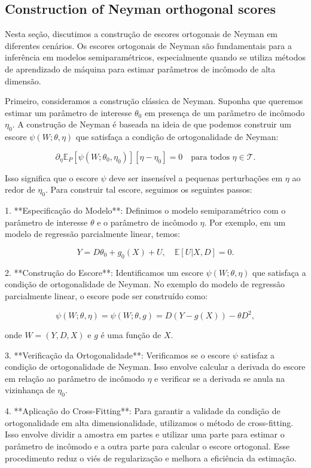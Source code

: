 \documentclass[a4paper,12pt]{article}[abntex2]
\begin{document}
\subsection{Construction  of  Neyman  orthogonal  scores}

Nesta seção, discutimos a construção de escores ortogonais de Neyman em diferentes cenários. Os escores ortogonais de Neyman são fundamentais para a inferência em modelos semiparamétricos, especialmente quando se utiliza métodos de aprendizado de máquina para estimar parâmetros de incômodo de alta dimensão.

Primeiro, consideramos a construção clássica de Neyman. Suponha que queremos estimar um parâmetro de interesse $\theta_0$ em presença de um parâmetro de incômodo $\eta_0$. A construção de Neyman é baseada na ideia de que podemos construir um escore $\psi(W; \theta, \eta)$ que satisfaça a condição de ortogonalidade de Neyman:

\[
\partial_\eta \mathbb{E}_P[\psi(W; \theta_0, \eta_0)][\eta - \eta_0] = 0 \quad \text{para todos } \eta \in \mathcal{T}.
\]

Isso significa que o escore $\psi$ deve ser insensível a pequenas perturbações em $\eta$ ao redor de $\eta_0$. Para construir tal escore, seguimos os seguintes passos:

1. **Especificação do Modelo**: Definimos o modelo semiparamétrico com o parâmetro de interesse $\theta$ e o parâmetro de incômodo $\eta$. Por exemplo, em um modelo de regressão parcialmente linear, temos:

\[
Y = D\theta_0 + g_0(X) + U, \quad \mathbb{E}[U | X,D] = 0.
\]

2. **Construção do Escore**: Identificamos um escore $\psi(W; \theta, \eta)$ que satisfaça a condição de ortogonalidade de Neyman. No exemplo do modelo de regressão parcialmente linear, o escore pode ser construído como:

\[
\psi(W; \theta, \eta) = \psi(W; \theta, g) = D(Y - g(X)) - \theta D^2,
\]

onde $W = (Y, D, X)$ e $g$ é uma função de $X$.

3. **Verificação da Ortogonalidade**: Verificamos se o escore $\psi$ satisfaz a condição de ortogonalidade de Neyman. Isso envolve calcular a derivada do escore em relação ao parâmetro de incômodo $\eta$ e verificar se a derivada se anula na vizinhança de $\eta_0$.

4. **Aplicação do Cross-Fitting**: Para garantir a validade da condição de ortogonalidade em alta dimensionalidade, utilizamos o método de cross-fitting. Isso envolve dividir a amostra em partes e utilizar uma parte para estimar o parâmetro de incômodo e a outra parte para calcular o escore ortogonal. Esse procedimento reduz o viés de regularização e melhora a eficiência da estimação.
\end{document}
